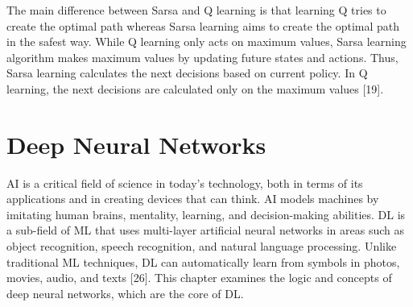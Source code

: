 \documentclass[12pt,twoside,a4]{mwbk}
\begin{document}
\noindent The main difference between Sarsa and Q learning is that learning Q tries to create the optimal path whereas Sarsa learning aims to create the optimal path in the safest way. While Q learning only acts on maximum values, Sarsa learning algorithm makes maximum values by updating future states and actions. Thus, Sarsa learning calculates the next decisions based on current policy. In Q learning, the next decisions are calculated only on the maximum values [19].

\section{Deep Neural Networks}
AI is a critical field of science in today's technology, both in terms of its applications and in creating devices that can think. AI models machines by imitating human brains, mentality, learning, and decision-making abilities. DL is a sub-field of ML that uses multi-layer artificial neural networks in areas such as object recognition, speech recognition, and natural language processing. Unlike traditional ML techniques, DL can automatically learn from symbols in photos, movies, audio, and texts [26]. This chapter examines the logic and concepts of deep neural networks, which are the core of DL.
\end{document}
